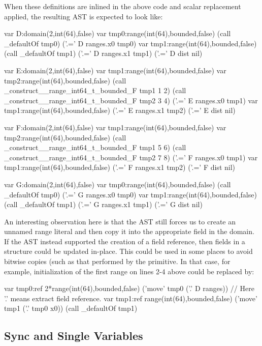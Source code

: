 When these definitions are inlined in the above code and scalar replacement applied, the
resulting AST is expected to look like:
\begin{numberedchapel}
  var D:domain(2,int(64),false)
  var tmp0:range(int(64),bounded,false)
  (call _defaultOf tmp0)
  ('.=' D ranges.x0 tmp0)
  var tmp1:range(int(64),bounded,false)
  (call _defaultOf tmp1)
  ('.=' D ranges.x1 tmp1)
  ('.=' D dist nil)

  var E:domain(2,int(64),false)
  var tmp1:range(int(64),bounded,false)
  var tmp2:range(int(64),bounded,false)
  (call _construct__range_int64_t_bounded_F tmp1 1 2)
  (call _construct__range_int64_t_bounded_F tmp2 3 4)
  ('.=' E ranges.x0 tmp1)
  var tmp1:range(int(64),bounded,false)
  ('.=' E ranges.x1 tmp2)
  ('.=' E dist nil)
  
  var F:domain(2,int(64),false)
  var tmp1:range(int(64),bounded,false)
  var tmp2:range(int(64),bounded,false)
  (call _construct__range_int64_t_bounded_F tmp1 5 6)
  (call _construct__range_int64_t_bounded_F tmp2 7 8)
  ('.=' F ranges.x0 tmp1)
  var tmp1:range(int(64),bounded,false)
  ('.=' F ranges.x1 tmp2)
  ('.=' F dist nil)
  
  var G:domain(2,int(64),false)
  var tmp0:range(int(64),bounded,false)
  (call _defaultOf tmp0)
  ('.=' G ranges.x0 tmp0)
  var tmp1:range(int(64),bounded,false)
  (call _defaultOf tmp1)
  ('.=' G ranges.x1 tmp1)
  ('.=' G dist nil)
\end{numberedchapel}
An interesting observation here is that the AST still forces us to create an unnamed range
literal and then copy it into the appropriate field in the domain.  If the AST instead
supported the creation of a field reference, then fields in a structure could be updated
in-place.  This could be used in some places to avoid bitwise copies (such as that
performed by the  primitive.  In that case, for example,
initialization of the first range on lines 2-4 above could be replaced by:
\begin{chapelcode}
  var tmp0:ref 2*range(int(64),bounded,false)
  ('move' tmp0 ('.' D ranges)) // Here '.' means extract field reference.
  var tmp1:ref range(int(64),bounded,false)
  ('move' tmp1 ('.' tmp0 x0))
  (call _defaultOf tmp1)
\end{chapelcode}


\subsection{Sync and Single Variables}

